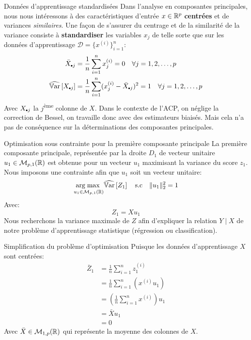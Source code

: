 \begin{frame}{Données d'apprentissage standardisées}
	Dans l'analyse en composantes principales, nous nous intéressons à des caractéristiques d'entrée $x \in \mathbb{R}^p$ \textbf{centrées} et de variances \textit{similaires}. Une façon de s'assurer du centrage et de la similarité de la variance consiste à \textbf{standardiser} les variables $x_j$ de telle sorte que sur les données d'apprentissage $\mathcal{D} = \{x^{(i)}\}_{i=1}^n$:
	\pause
	\begin{equation}
		\begin{aligned}
			\bar{X}_{\bigdot j} &= \displaystyle \frac{1}{n} \sum_{i=1}^n x_j^{(i)} = 0 \quad \forall j=1, 2, \dots, p \\
			\Varhat{X_{\bigdot j}} &= \displaystyle \frac{1}{n} \sum_{i=1}^n (x_j^{(i)} - \bar{X}_{\bigdot j})^2 = 1 \quad \forall j=1, 2, \dots, p
		\end{aligned}
		\nonumber
	\end{equation}
	\pause
	Avec $X_{\bigdot j}$ la $j$\textsuperscript{ème} colonne de $X$. Dans le contexte de l'ACP, on néglige la correction de Bessel, on travaille donc avec des estimateurs biaisés. Mais cela n'a pas de conséquence sur la déterminations des composantes principales.
\end{frame}

\begin{frame}{Optimisation sous contrainte pour la première composante principale}
	La première composante principale, représentée par la droite $D_1$ de vecteur unitaire $u_1 \in \mathcal{M}_{p,1}(\mathbb{R})$ est obtenue pour un vecteur $u_1$ maximisant la variance du score $z_1$. Nous imposons une contrainte afin que $u_1$ soit un vecteur unitaire:
	\begin{equation}
		\underset{u_1 \in \mathcal{M}_{p,1}(\mathbb{R})}{\operatorname{arg\;max}\;} \widehat{\operatorname{\mathbb{V}ar}}\left[Z_1\right] \quad \text{s.c} \quad \|u_1\|_2^2 = 1
		\nonumber
	\end{equation}
	Avec:
	\begin{equation}
		Z_1 = X u_1
		\nonumber
	\end{equation}
	Nous recherchons la variance maximale de $Z$ afin d'expliquer la relation $Y \mid X$ de notre problème d'apprentissage statistique (régression ou classification).
\end{frame}

\begin{frame}{Simplification du problème d'optimisation}
	Puisque les données d'apprentissage $X$ sont centrées:
	\begin{equation}
		\begin{aligned}
			\bar{Z}_1 
			&= \frac{1}{n} \sum_{i=1}^n z_1^{(i)} \\
			&= \frac{1}{n} \sum_{i=1}^n \left(x^{(i)} u_1\right) \\
			&= \left(\frac{1}{n} \sum_{i=1}^n x^{(i)}\right) u_1 \\
			&= \bar{X} u_1 \\
			&= 0
		\end{aligned}
		\nonumber
	\end{equation}
	Avec $\bar{X} \in \mathcal{M}_{1,p}(\mathbb{R})$ qui représente la moyenne des colonnes de $X$. 
\end{frame}

